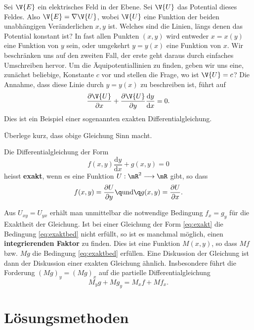 \documentclass[%
11pt,%
twoside,%
titlepage,%
german,%
headsepline%
]{scrartcl}
\begin{document}
Sei $\V{E}$ ein elektrisches Feld in der Ebene.
Sei $\V{U}$ das Potential dieses Feldes. Also $\V{E}=\nabla\V{U}$, wobei $\V{U}$ eine Funktion der beiden unabh\"angigen Ver\"anderlichen $x,y$ ist. Welches sind die Linien, l\"angs denen das Potential konstant ist? In fast allen Punkten $(x,y)$ wird entweder $x = x(y)$ eine Funktion von $y$ sein, oder umgekehrt $y = y(x)$ eine Funktion von $x$.
Wir beschr\"anken uns auf den zweiten Fall, der erste geht daraus durch einfaches Umschreiben hervor.
Um die \"Aquipotentiallinien zu finden, geben wir uns eine, zun\"achst beliebige, Konstante $c$ vor und stellen die Frage, wo ist $\V{U}= c$? Die Annahme, dass diese Linie durch $y = y(x)$ zu beschreiben ist, f\"uhrt auf
$$\frac{\partial\V{U}}{\partial x}+\frac{\partial\V{U}}{\partial y}\frac{\mathrm{d}y}{\mathrm{d}x}=0.$$
Dies ist ein Beispiel einer sogenannten exakten Differentialgleichung.

\begin{ueb}
\"Uberlege kurz, dass obige Gleichung Sinn macht.
\end{ueb}

\begin{defn}
Die
Differentialgleichung der Form
\begin{equation}\label{eq:exakt}
f(x,y)\frac{\mathrm{d}y}{\mathrm{d}x}+g(x,y)=0
\end{equation}
heisst \textbf{exakt}, wenn es eine Funktion $U:\mR^2\longrightarrow\mR$ gibt, so dass
\begin{equation}\label{eq:exaktbed}
f(x,y)=\frac{\partial U}{\partial y}\q\text{und}\q g(x,y)=\frac{\partial U}{\partial x}.
\end{equation}
\end{defn}
\noindent Aus $U_{xy}=U_{yx}$ erh\"alt man unmittelbar die notwendige Bedingung $f_x=g_y$ f\"ur die Exaktheit der Gleichung. Ist bei einer Gleichung der Form \eqref{eq:exakt} die Bedingung \eqref{eq:exaktbed} nicht erf\"ullt, so ist es manchmal m\"oglich, einen \textbf{integrierenden Faktor} zu finden. Dies ist eine Funktion $M(x,y)$, so dass $Mf$ bzw. $Mg$ die Bedingung \eqref{eq:exaktbed} erf\"ullen. Eine Diskussion der Gleichung ist dann der Diskussion einer exakten Gleichung \"ahnlich. Insbesondere f\"uhrt die Forderung $(Mg)_y=(Mg)_x$ auf die partielle Differentialgleichung
$$M_yg+Mg_y=M_xf+Mf_x.$$

\newpage

\section{L\"osungsmethoden}
\end{document}
